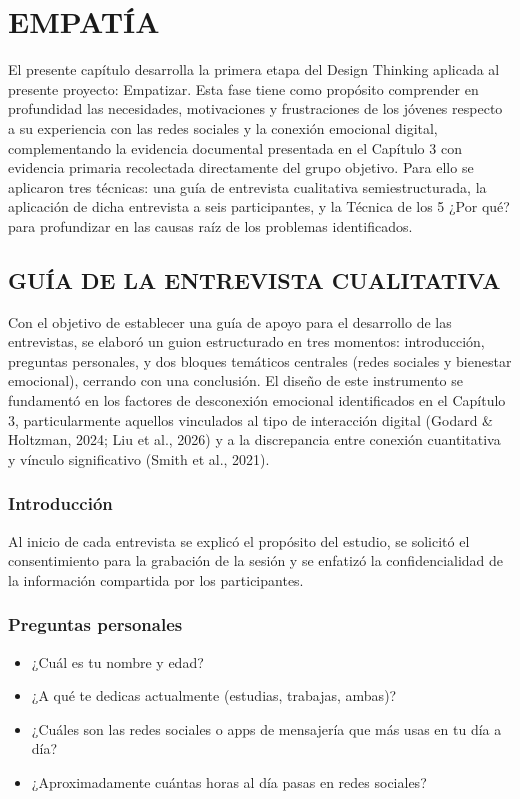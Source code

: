 \chapter{EMPATÍA}
El presente capítulo desarrolla la primera etapa del Design Thinking aplicada al presente proyecto: Empatizar. Esta fase tiene como propósito comprender en profundidad las necesidades, motivaciones y frustraciones de los jóvenes respecto a su experiencia con las redes sociales y la conexión emocional digital, complementando la evidencia documental presentada en el Capítulo 3 con evidencia primaria recolectada directamente del grupo objetivo. Para ello se aplicaron tres técnicas: una guía de entrevista cualitativa semiestructurada, la aplicación de dicha entrevista a seis participantes, y la Técnica de los 5 ¿Por qué? para profundizar en las causas raíz de los problemas identificados.

\section{GUÍA DE LA ENTREVISTA CUALITATIVA}
Con el objetivo de establecer una guía de apoyo para el desarrollo de las entrevistas, se elaboró un guion estructurado en tres momentos: introducción, preguntas personales, y dos bloques temáticos centrales (redes sociales y bienestar emocional), cerrando con una conclusión. El diseño de este instrumento se fundamentó en los factores de desconexión emocional identificados en el Capítulo 3, particularmente aquellos vinculados al tipo de interacción digital (Godard \& Holtzman, 2024; Liu et al., 2026) y a la discrepancia entre conexión cuantitativa y vínculo significativo (Smith et al., 2021).

\subsection{Introducción}
Al inicio de cada entrevista se explicó el propósito del estudio, se solicitó el consentimiento para la grabación de la sesión y se enfatizó la confidencialidad de la información compartida por los participantes.

\subsection{Preguntas personales}
\begin{itemize}
    \item ¿Cuál es tu nombre y edad?
    \item ¿A qué te dedicas actualmente (estudias, trabajas, ambas)?
    \item ¿Cuáles son las redes sociales o apps de mensajería que más usas en tu día a día?
    \item ¿Aproximadamente cuántas horas al día pasas en redes sociales?
\end{itemize}

